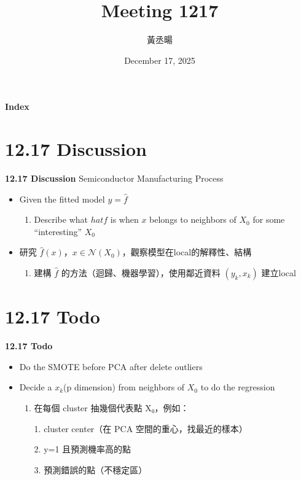 \documentclass[12pt,aspectratio=43]{beamer}
\title{Meeting 1217}
\author{黃丞暘}
\institute{國立東華大學應數統計所}
\date{December 17, 2025}
\begin{document}
\begin{frame}
  \titlepage
\end{frame}

\begin{frame}{\textbf{Index}}
  \tableofcontents
\end{frame}

\section{12.17 Discussion}

\begin{frame}{\textbf{12.17 Discussion}}
\linespread{1.5}
  Semiconductor Manufacturing Process
  \begin{itemize}
    \item Given the fitted model $y=\hat{f}$
    \begin{enumerate}[]
      \item Describe what $hat{f}$ is when $x$ belongs to neighbors of $X_0$ for some “interesting” $X_0$

    \end{enumerate}
  \end{itemize}
  \begin{itemize}
    \item 研究  $\hat f(x)$，$x \in \mathcal{N}(X_0)$，觀察模型在local的解釋性、結構
    \begin{enumerate}[]
      \item 建構 \(\hat f\) 的方法（迴歸、機器學習），使用鄰近資料 \((y_k, x_k)\) 建立local
    \end{enumerate}

  \end{itemize}
\end{frame}

\section{12.17 Todo}

\begin{frame}{\textbf{12.17 Todo}}
\linespread{1.5}
  \begin{itemize}[]
    \item Do the SMOTE before PCA after delete outliers
  \end{itemize}
  \begin{itemize}[]
    \item Decide a $x_k$(p dimension) from neighbors of $X_0$ to do the regression
  \begin{enumerate}[]

    \item 在每個 cluster 抽幾個代表點 X₀，例如：

1. cluster center（在 PCA 空間的重心，找最近的樣本）

2. y=1 且預測機率高的點

3. 預測錯誤的點（不穩定區）
  \end{enumerate}

  \end{itemize}
\end{frame}
\end{document}
